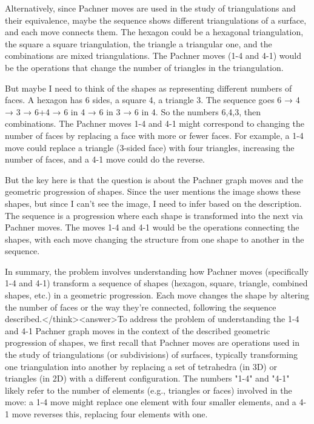 Alternatively, since Pachner moves are used in the study of triangulations and their equivalence, maybe the sequence shows different triangulations of a surface, and each move connects them. The hexagon could be a hexagonal triangulation, the square a square triangulation, the triangle a triangular one, and the combinations are mixed triangulations. The Pachner moves (1-4 and 4-1) would be the operations that change the number of triangles in the triangulation.

But maybe I need to think of the shapes as representing different numbers of faces. A hexagon has 6 sides, a square 4, a triangle 3. The sequence goes 6 → 4 → 3 → 6+4 → 6 in 4 → 6 in 3 → 6 in 4. So the numbers 6,4,3, then combinations. The Pachner moves 1-4 and 4-1 might correspond to changing the number of faces by replacing a face with more or fewer faces. For example, a 1-4 move could replace a triangle (3-sided face) with four triangles, increasing the number of faces, and a 4-1 move could do the reverse.

But the key here is that the question is about the Pachner graph moves and the geometric progression of shapes. Since the user mentions the image shows these shapes, but since I can't see the image, I need to infer based on the description. The sequence is a progression where each shape is transformed into the next via Pachner moves. The moves 1-4 and 4-1 would be the operations connecting the shapes, with each move changing the structure from one shape to another in the sequence.

In summary, the problem involves understanding how Pachner moves (specifically 1-4 and 4-1) transform a sequence of shapes (hexagon, square, triangle, combined shapes, etc.) in a geometric progression. Each move changes the shape by altering the number of faces or the way they're connected, following the sequence described.</think><answer>To address the problem of understanding the 1-4 and 4-1 Pachner graph moves in the context of the described geometric progression of shapes, we first recall that Pachner moves are operations used in the study of triangulations (or subdivisions) of surfaces, typically transforming one triangulation into another by replacing a set of tetrahedra (in 3D) or triangles (in 2D) with a different configuration. The numbers "1-4" and "4-1" likely refer to the number of elements (e.g., triangles or faces) involved in the move: a 1-4 move might replace one element with four smaller elements, and a 4-1 move reverses this, replacing four elements with one.


